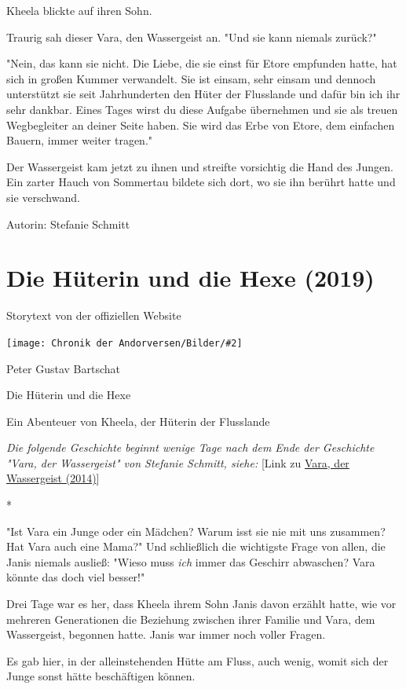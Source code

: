 \documentclass[10pt, a4paper, oneside]{book}
\newcommand{\fillbreak}{\vspace*{\fill}\columnbreak}
\newcommand{\storytext}[1]{%
    \section{#1}%
    \label{Storytext: #1}%
}
\newcommand{\refstorytext}[1]{\hyperref[Storytext: #1]{#1}}
\newcommand{\bildmitts}[2][height=0.32\textwidth,width=0.48\textwidth,keepaspectratio]{%
    \begin{center}
        \texttt{[image: Chronik der Andorversen/Bilder/\#2]}
    \end{center}
}
\begin{document}
\begin{multicols}{2}
Kheela blickte auf ihren Sohn.

Traurig sah dieser Vara, den Wassergeist an. "Und sie kann niemals zurück?"

"Nein, das kann sie nicht. Die Liebe, die sie einst für Etore empfunden hatte, hat sich in großen Kummer verwandelt. Sie ist einsam, sehr einsam und dennoch unterstützt sie seit Jahrhunderten den Hüter der Flusslande und dafür bin ich ihr sehr dankbar. Eines Tages wirst du diese Aufgabe übernehmen und sie als treuen Wegbegleiter an deiner Seite haben. Sie wird das Erbe von Etore, dem einfachen Bauern, immer weiter tragen."

Der Wassergeist kam jetzt zu ihnen und streifte vorsichtig die Hand des Jungen.  Ein zarter Hauch von Sommertau bildete sich dort, wo sie ihn berührt hatte und sie verschwand.\bigskip

Autorin: Stefanie Schmitt




\fillbreak
\storytext{Die Hüterin und die Hexe (2019)}

\begin{center}
    Storytext von der offiziellen Website
\end{center}

\bildmitts{Die Hüterin und die Hexe Bild 1.jpg}

Peter Gustav Bartschat

Die Hüterin und die Hexe

Ein Abenteuer von Kheela, der Hüterin der Flusslande\bigskip

\textit{Die folgende Geschichte beginnt wenige Tage nach dem Ende der Geschichte "Vara, der Wassergeist" von Stefanie Schmitt, siehe:} [Link zu \refstorytext{Vara, der Wassergeist (2014)}]

\begin{center}
    * 
\end{center}

"Ist Vara ein Junge oder ein Mädchen? Warum isst sie nie mit uns zusammen? 
Hat Vara auch eine Mama?" Und schließlich die wichtigste Frage von allen, die Janis niemals ausließ: "Wieso muss \textit{ich} immer das Geschirr abwaschen? Vara könnte das doch viel besser!" 

Drei Tage war es her, dass Kheela ihrem Sohn Janis davon erzählt hatte, wie vor mehreren Generationen die Beziehung zwischen ihrer Familie und Vara, dem Wassergeist, begonnen hatte. Janis war immer noch voller Fragen. 

Es gab hier, in der alleinstehenden Hütte am Fluss, auch wenig, womit sich der Junge sonst hätte beschäftigen können. 


\end{multicols}
\end{document}
